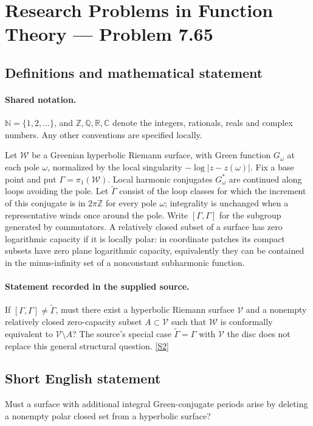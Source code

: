 \documentclass[11pt]{article}
\newcommand{\sref}[2]{\hyperlink{source:#1:#2}{[S#2]}}
\begin{document}
\section{Research Problems in Function Theory — Problem 7.65}\label{statement}

\subsection{Definitions and mathematical statement}

\paragraph{Shared notation.}$\mathbb N=\{1,2,\ldots\}$, and $\mathbb Z,\mathbb Q,\mathbb R,\mathbb C$ denote the integers, rationals, reals and complex numbers. Any other conventions are specified locally.


Let $\mathcal W$ be a Greenian hyperbolic Riemann surface, with Green function $G_\omega$ at each pole $\omega$, normalized by the local singularity $-\log|z-z(\omega)|$. Fix a base point and put $\Gamma=\pi_1(\mathcal W)$. Local harmonic conjugates $G_\omega^*$ are continued along loops avoiding the pole. Let $\widetilde\Gamma$ consist of the loop classes for which the increment of this conjugate is in $2\pi\mathbb Z$ for every pole $\omega$; integrality is unchanged when a representative winds once around the pole. Write $[\Gamma,\Gamma]$ for the subgroup generated by commutators. A relatively closed subset of a surface has zero logarithmic capacity if it is locally polar: in coordinate patches its compact subsets have zero plane logarithmic capacity, equivalently they can be contained in the minus-infinity set of a nonconstant subharmonic function.
\paragraph{Statement recorded in the supplied source.}
If $[\Gamma,\Gamma]\ne\widetilde\Gamma$, must there exist a hyperbolic Riemann surface $\mathcal V$ and a nonempty relatively closed zero-capacity subset $A\subset\mathcal V$ such that $\mathcal W$ is conformally equivalent to $\mathcal V\setminus A$? The source's special case $\widetilde\Gamma=\Gamma$ with $\mathcal V$ the disc does not replace this general structural question. \sref{statement}{2}
\subsection{Short English statement}
Must a surface with additional integral Green-conjugate periods arise by deleting a nonempty polar closed set from a hyperbolic surface?
\end{document}
